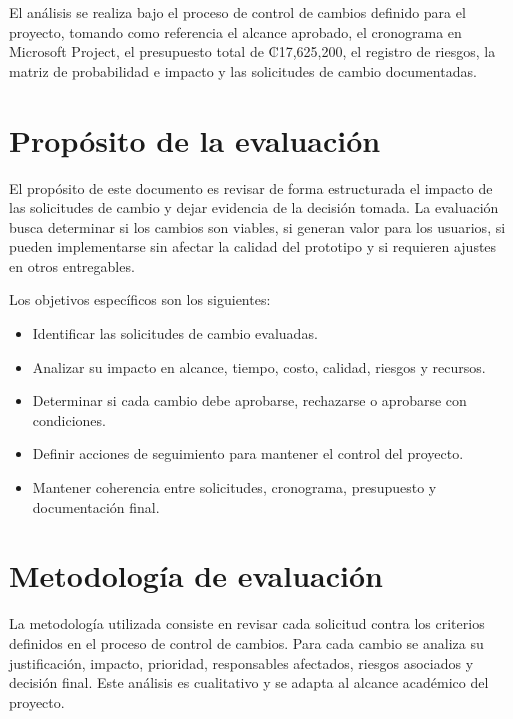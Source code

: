 \documentclass[11pt,spanish]{article}
\begin{document}
El análisis se realiza bajo el proceso de control de cambios definido para el proyecto, tomando como referencia el alcance aprobado, el cronograma en Microsoft Project, el presupuesto total de ₡17,625,200, el registro de riesgos, la matriz de probabilidad e impacto y las solicitudes de cambio documentadas.

\section{Propósito de la evaluación}

El propósito de este documento es revisar de forma estructurada el impacto de las solicitudes de cambio y dejar evidencia de la decisión tomada. La evaluación busca determinar si los cambios son viables, si generan valor para los usuarios, si pueden implementarse sin afectar la calidad del prototipo y si requieren ajustes en otros entregables.

Los objetivos específicos son los siguientes:

\begin{itemize}[leftmargin=*, label={\textbullet}]
    \item Identificar las solicitudes de cambio evaluadas.
    \item Analizar su impacto en alcance, tiempo, costo, calidad, riesgos y recursos.
    \item Determinar si cada cambio debe aprobarse, rechazarse o aprobarse con condiciones.
    \item Definir acciones de seguimiento para mantener el control del proyecto.
    \item Mantener coherencia entre solicitudes, cronograma, presupuesto y documentación final.
\end{itemize}

\section{Metodología de evaluación}

La metodología utilizada consiste en revisar cada solicitud contra los criterios definidos en el proceso de control de cambios. Para cada cambio se analiza su justificación, impacto, prioridad, responsables afectados, riesgos asociados y decisión final. Este análisis es cualitativo y se adapta al alcance académico del proyecto.
\end{document}
